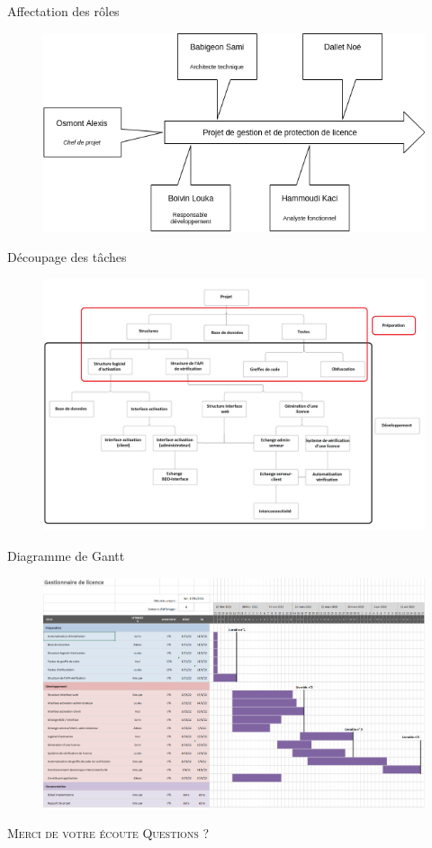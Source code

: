 \documentclass{cubeamer}
\begin{document}
\begin{frame}{Affectation des rôles}
    \begin{figure}
        \centering
        \includegraphics[scale=0.55]{img/schema_role_projet.png}
    \end{figure}
\end{frame}

\begin{frame}{Découpage des tâches}
    \begin{figure}
        \centering
        \includegraphics[scale=0.18]{img/organi.png}
    \end{figure}
\end{frame}

\begin{frame}{Diagramme de Gantt}
    \begin{figure}
        \centering
        \includegraphics[scale=0.22]{img/Gantt.png}
    \end{figure}
\end{frame}

\begin{frame}[standout]
    \Huge\textsc{Merci de votre écoute}
    \vfill
    \LARGE\textsc{Questions ?}
\end{frame}
\end{document}
